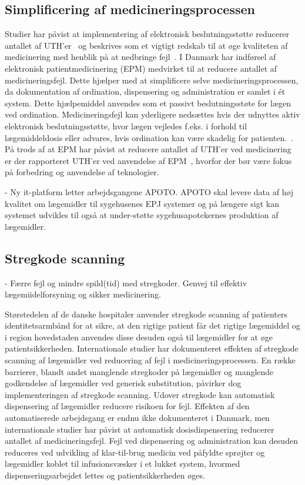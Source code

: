 \subsection{Simplificering af medicineringsprocessen}
Studier har påvist at implementering af elektronisk beslutningsstøtte reducerer antallet af UTH'er~\citep{DW1998,Bates2013,Cheng2011,Raboel2005} og beskrives som et vigtigt redskab til at øge kvaliteten af medicinering med henblik på at nedbringe fejl~\citep{Raboel2005}. I Danmark har indførsel af elektronisk patientmedicinering (EPM) medvirket til at reducere antallet af medicineringsfejl. Dette hjælper med at simplificere selve medicineringsprocessen, da dokumentation af ordination, dispensering og administration er samlet i ét system. Dette hjælpemiddel anvendes som et passivt beslutningsstøte for lægen ved ordination.
Medicineringsfejl kan yderligere nedsættes hvis der udnyttes aktiv elektronisk beslutningsstøtte, hvor lægen vejledes f.eks. i forhold til lægemiddeldosis eller advares, hvis ordination kan være skadelig for patienten.~\citep{Raboel2005}. På trods af at EPM har påvist at reducere antallet af UTH'er ved medicinering er der rapporteret UTH'er ved anvendelse af EPM~\citep{Syddanmark2008}, hvorfor der bør være fokus på forbedring og anvendelse af teknologier. 



- Ny it-platform letter arbejdsgangene APOTO. APOTO skal levere data af høj kvalitet om lægemidler til sygehusenes EPJ systemer og på længere sigt kan
systemet udvikles til også at under-støtte sygehusapotekernes produktion af lægemidler.  %


\subsection{Stregkode scanning}


- Færre fejl og mindre spild(tid) med stregkoder. Genvej til effektiv lægemiidelforsyning og sikker medicinering. 

Størstedelen af de danske hospitaler anvender stregkode scanning af patienters identitetsarmbånd for at sikre, at den rigtige patient får det rigtige lægemiddel og i region hovedstaden anvendes disse desuden også til lægemidler for at øge patientsikkerheden. Internationale studier har dokumenteret effekten af stregkode scanning af lægemidler ved reducering af fejl i medicineringsprocessen. En række barrierer, blandt andet manglende stregkoder på lægemidler og manglende godkendelse af lægemidler ved generisk substitution, påvirker dog implementeringen af stregkode scanning. Udover stregkode kan automatisk dispensering af lægemidler reducere risikoen for fejl. Effekten af den automatiserede arbejdsgang er endnu ikke dokumenteret i Danmark, men internationale studier har påvist at automatisk dosisdispensering reducerer antallet af medicineringsfejl.  Fejl ved dispensering og administration kan desuden reduceres ved udvikling af klar-til-brug medicin ved påfyldte sprøjter og lægemidler koblet til infusionsvæsker i et lukket system, hvormed dispenseringsarbejdet lettes og patientsikkerheden øges. 

